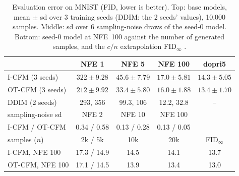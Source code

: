 \begin{table}[t]
\centering
\caption{Evaluation error on MNIST (FID, lower is better). Top: base models, mean $\pm$ sd over 3 training seeds (DDIM: the 2 seeds' values), 10,000 samples. Middle: sd over 6 sampling-noise draws of the seed-0 model. Bottom: seed-0 model at NFE~100 against the number of generated samples, and the $c/n$ extrapolation FID$_\infty$ \citep{chong2020fid}.}
\label{tab:c1}
\small
\begin{tabular}{lcccc}
\toprule
 & NFE 1 & NFE 5 & NFE 100 & dopri5 \\
\midrule
I-CFM (3 seeds) & $322\pm9.28$ & $45.6\pm7.79$ & $17.0\pm5.81$ & $14.3\pm5.05$ \\
OT-CFM (3 seeds) & $212\pm9.92$ & $33.4\pm5.80$ & $16.0\pm1.88$ & $13.4\pm1.70$ \\
DDIM (2 seeds) & 293, 356 & 99.3, 106 & 12.2, 32.8 & -- \\
\midrule
sampling-noise sd & NFE 2 & NFE 10 & NFE 100 & \\
\midrule
I-CFM / OT-CFM & 0.34 / 0.58 & 0.13 / 0.28 & 0.13 / 0.05 & \\
\midrule
samples ($n$) & 2k / 5k & 10k & 20k & FID$_\infty$ \\
\midrule
I-CFM, NFE 100 & 17.3 / 14.9 & 14.5 & 14.1 & 13.7 \\
OT-CFM, NFE 100 & 17.1 / 14.5 & 13.9 & 13.4 & 13.0 \\
\bottomrule
\end{tabular}
\end{table}
